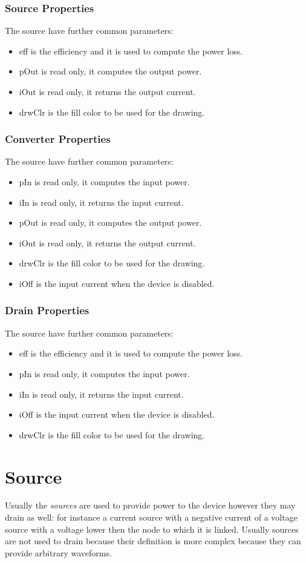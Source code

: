 \documentclass[12pt,a4paper]{book}
\begin{document}
\subsubsection{Source Properties}
The source have further common parameters:
\begin{itemize}
\item eff is the efficiency and it is used to compute the power loss.
\item pOut is read only, it computes the output power.
\item iOut is read only, it returns the output current.
\item drwClr is the fill color to be used for the drawing.
\end{itemize}
\subsubsection{Converter Properties}
The source have further common parameters:
\begin{itemize}
\item pIn is read only, it computes the input power.
\item iIn is read only, it returns the input current.
\item pOut is read only, it computes the output power.
\item iOut is read only, it returns the output current.
\item drwClr is the fill color to be used for the drawing.
\item iOff is the input current when the device is disabled. 
\end{itemize}
\subsubsection{Drain Properties}
The source have further common parameters:
\begin{itemize}
\item eff is the efficiency and it is used to compute the power loss.
\item pIn is read only, it computes the input power.
\item iIn is read only, it returns the input current.
\item iOff is the input current when the device is disabled. 
\item drwClr is the fill color to be used for the drawing.
\end{itemize}
\section{Source}
Usually the \emph{sources} are used to provide power to the device however they may drain as well: for instance a current source with a negative current of a voltage source with a voltage lower then the node to which it is linked. Usually sources are not used to drain because their definition is more complex because they can provide arbitrary waveforms.
\end{document}
